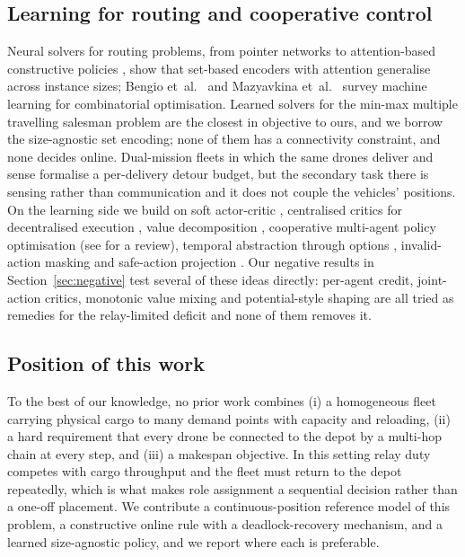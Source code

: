 \documentclass[final,5p,times,twocolumn]{elsarticle}
\begin{document}
\subsection{Learning for routing and cooperative control}
\label{sec:rel-learning}
Neural solvers for routing problems, from pointer networks \cite{vinyals2015} to
attention-based constructive policies \cite{nazari2018,kool2019}, show that set-based encoders
with attention generalise across instance sizes; Bengio et~al.\ \cite{bengio2021} and
Mazyavkina et~al.\ \cite{mazyavkina2021} survey machine learning for combinatorial optimisation.
Learned solvers for the min-max multiple travelling salesman problem \cite{park2023,guo2024}
are the closest in objective to ours, and we borrow the size-agnostic set encoding; none of them
has a connectivity constraint, and none decides online. Dual-mission fleets in which the same
drones deliver and sense \cite{zhu2026} formalise a per-delivery detour budget, but the secondary
task there is sensing rather than communication and it does not couple the vehicles' positions.
On the learning side we build on soft actor-critic \cite{haarnoja2018}, centralised critics for
decentralised execution \cite{lowe2017,foerster2018}, value decomposition
\cite{sunehag2018,rashid2018}, cooperative multi-agent policy optimisation \cite{yu2022} (see
\cite{oroojlooy2023} for a review), temporal abstraction through options
\cite{sutton1999,bacon2017,vezhnevets2017}, invalid-action masking \cite{huang2022} and
safe-action projection \cite{dalal2018}. Our negative results in Section~\ref{sec:negative} test
several of these ideas directly: per-agent credit, joint-action critics, monotonic value mixing
and potential-style shaping \cite{ng1999} are all tried as remedies for the relay-limited deficit
and none of them removes it.

\subsection{Position of this work}
\label{sec:rel-position}
To the best of our knowledge, no prior work combines (i) a homogeneous fleet carrying physical
cargo to many demand points with capacity and reloading, (ii) a hard requirement that every drone
be connected to the depot by a multi-hop chain at every step, and (iii) a makespan objective.
In this setting relay duty competes with cargo throughput and the fleet must return to the depot
repeatedly, which is what makes role assignment a sequential decision rather than a one-off
placement. We contribute a continuous-position reference model of this problem, a constructive
online rule with a deadlock-recovery mechanism, and a learned size-agnostic policy, and we
report where each is preferable.
\end{document}
